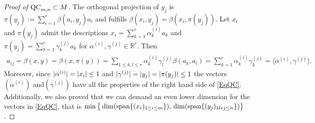 \begin{proof}[Proof of $ \textup{QC}_{m,n} \subset M $]
	The orthogonal projection of $ y_j $ is $ \pi(y_j):= \sum_{i=1}^{r}\beta(a_i,y_j)a_i $ and fulfills
	$ \beta(x_i,y_j) = \beta(x_i,\pi(y_j)) $. 
	Let $ x_i $ and $ \pi(y_j) $ admit the descriptions 
	$ x_i = \sum_{k=1}^{r}\alpha_k^{(i)}a_k$ and $  \pi(y_j) = \sum_{k=1}^r \gamma_k^{(j)} a_k$ for $ \alpha^{(i)}, \gamma^{(j)} \in \mathbb{R}^r $. Then
	\begin{align*}
	a_{ij}= \beta(x,y)= \beta(x,\pi(y)) = \sum_{1 \le k,l \le r} \alpha_k^{(i)} \gamma_l^{(j)} \beta(a_k,a_l) = \sum_{k=1}^{r}\alpha_k^{(i)}\gamma_k^{(j)} = \langle \alpha^{(i)}, \gamma^{(j)} \rangle.
	\end{align*}
	Moreover, since $ \vert\alpha^{(i)} \vert= {\left|{x_i}\right|} \le 1$ and $\vert \gamma^{(j)}\vert=  {\left|{y_j}\right|}= {\left|{\pi(y_j)}\right|} \le 1 $ the vectors $ (\alpha^{(i)}) $ and$ (\gamma^{(j)}) $ have all the properties of the right hand side of \ref{EqQC}.
	Additionally, we also proved that we can demand an even lower dimension for the vectors in \ref{EqQC}, that is  
	$ \min \big \{ \dim( \textup{span} \{ (x_i)_{1 \le i \le m} \}),\, \dim(\textup{span} \{ (y_j)_{1 le j \le n} \} )\big \} $.
\end{proof}

